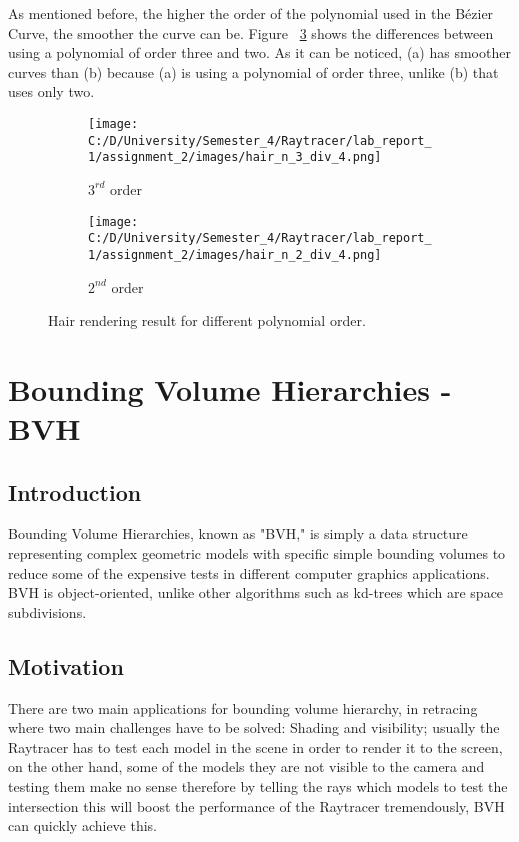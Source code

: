 \documentclass{article}
\begin{document}
	
	As mentioned before, the higher the order of the polynomial used in the Bézier Curve, the smoother the curve can be. Figure ~\ref{fig:11} shows the differences between using a polynomial of order three and two. As it can be noticed, (a) has smoother curves than (b) because (a) is using a polynomial of order three, unlike (b) that uses only two.
	\begin{figure}[H]
		\begin{center}
			\begin{subfigure}{.3\textwidth}
				\centering
				\texttt{[image: C:/D/University/Semester\_4/Raytracer/lab\_report\_1/assignment\_2/images/hair\_n\_3\_div\_4.png]}  
				\caption{$3^{rd}$ order}
				\label{fig:sub-first}
			\end{subfigure}
			\begin{subfigure}{.3\textwidth}
				\centering
				\texttt{[image: C:/D/University/Semester\_4/Raytracer/lab\_report\_1/assignment\_2/images/hair\_n\_2\_div\_4.png]}  
				\caption{$2^{nd}$ order}
				\label{fig:sub-second}
			\end{subfigure}
			\caption{Hair rendering result for different polynomial order.}
			\label{fig:11}
		\end{center}
	\end{figure}
	
	
	\clearpage
	\section{Bounding Volume Hierarchies - BVH}
	\subsection{Introduction}
	\label{definitions}
	Bounding Volume Hierarchies, known as "BVH," is simply a data structure representing complex geometric models with specific simple bounding volumes to reduce some of the expensive tests in different computer graphics applications.
	BVH is object-oriented, unlike other algorithms such as kd-trees which are space subdivisions.
	
	
	
	
	\subsection{Motivation}
	There are two main applications for bounding volume hierarchy, in retracing where two main challenges have to be solved: Shading and visibility; usually the Raytracer has to test each model in the scene in order to render it to the screen, on the other hand, some of the models they are not visible to the camera and testing them make no sense therefore by telling the rays which models to test the intersection this will boost the performance of the Raytracer tremendously, BVH can quickly achieve this.
	
\end{document}

